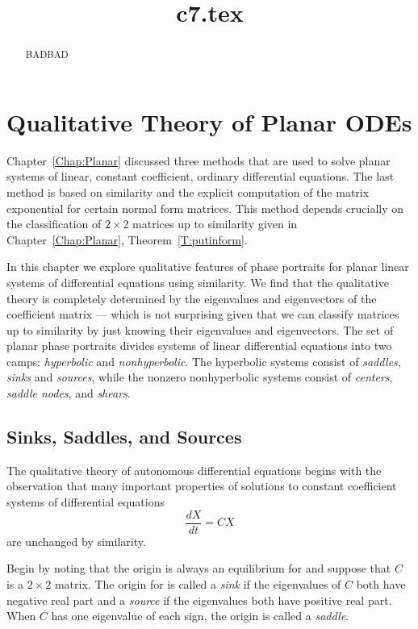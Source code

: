 \documentclass{ximera}
\title{c7.tex}
\begin{document}
\begin{abstract}
BADBAD
\end{abstract}
\maketitle

\chapter{Qualitative Theory of Planar ODEs}
\label{Chap:PlanarQ}

\normalsize

Chapter~\ref{Chap:Planar} discussed three methods that are used to solve
planar systems of linear, constant coefficient, ordinary differential
equations.  The last method is based on similarity and the explicit
computation of the matrix exponential for certain normal form matrices.
This method depends crucially on the classification of $2\times 2$ matrices
up to similarity given in Chapter~\ref{Chap:Planar}, 
Theorem~\ref{T:putinform}.

In this chapter we explore qualitative features of phase portraits for planar 
linear systems of differential equations using similarity.  We find that the 
qualitative theory is completely determined by the eigenvalues and 
eigenvectors of the coefficient matrix --- which is not surprising given
that we can classify matrices up to similarity by just knowing their
eigenvalues and eigenvectors.  The set of planar phase portraits divides 
systems of linear differential equations into two camps: {\em hyperbolic\/} 
and {\em nonhyperbolic\/}.  The hyperbolic systems consist of {\em saddles\/},
{\em sinks\/} and {\em sources\/}, while the nonzero nonhyperbolic systems 
consist of {\em centers\/}, {\em saddle nodes\/}, and {\em shears\/}.


\section{Sinks, Saddles, and Sources} \label{S:6.7}

The qualitative theory of autonomous differential equations begins with
the observation that many important properties of solutions to constant
coefficient systems of differential equations
\begin{equation} \label{e:C2}
\frac{dX}{dt}=CX
\end{equation}
are unchanged by similarity.

Begin by noting that the origin is always an equilibrium for 
and suppose that $C$ is a $2\times 2$ matrix.  The origin for 
is called a {\em sink\/} if the eigenvalues of $C$ both have
negative real
part and a {\em source\/} if the eigenvalues both have
positive real part.
When $C$ has one eigenvalue of each sign, the origin is called a
{\em saddle}.
\end{document}
